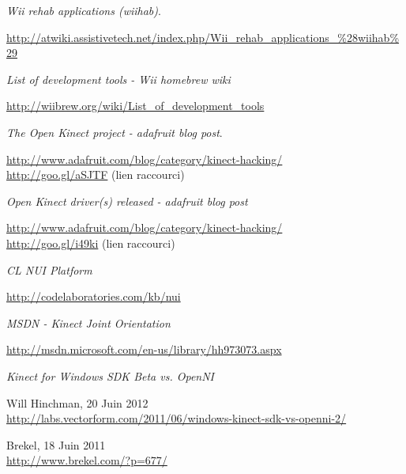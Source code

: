 \begin{thebibliography}{200}
\begin{footnotesize}
  \emph{Wii rehab applications (wiihab)}.\\
  \begin{tiny}
  \url{http://atwiki.assistivetech.net/index.php/Wii_rehab_applications_\%28wiihab\%29}
  \end{tiny}
  
  \emph{List of development tools - Wii homebrew wiki}\\
  \begin{tiny}
  \url{http://wiibrew.org/wiki/List_of_development_tools}
  \end{tiny}
  
  \emph{The Open Kinect project - adafruit blog post}. \\
  \begin{tiny}
  \url{http://www.adafruit.com/blog/category/kinect-hacking/}\\
  \url{http://goo.gl/aSJTF} (lien raccourci)
  \end{tiny}

  \emph{Open Kinect driver(s) released - adafruit blog post}\\
  \begin{tiny}
  \url{http://www.adafruit.com/blog/category/kinect-hacking/}\\
  \url{http://goo.gl/i49ki} (lien raccourci)
  \end{tiny}

  \emph{CL NUI Platform}\\
  \begin{tiny}
  \url{http://codelaboratories.com/kb/nui}
  \end{tiny}
  
  \emph{MSDN - Kinect Joint Orientation}\\
  \begin{tiny}
  \url{http://msdn.microsoft.com/en-us/library/hh973073.aspx}
  \end{tiny}
  
  \emph{Kinect for Windows SDK Beta vs. OpenNI}\\
  \begin{tiny}
  Will Hinchman, 20 Juin 2012\\
  \url{http://labs.vectorform.com/2011/06/windows-kinect-sdk-vs-openni-2/}
  \end{tiny}
  
  \begin{tiny}
  Brekel, 18 Juin 2011\\
  \url{http://www.brekel.com/?p=677/}
  \end{tiny}
  

\end{footnotesize}
\end{thebibliography}
